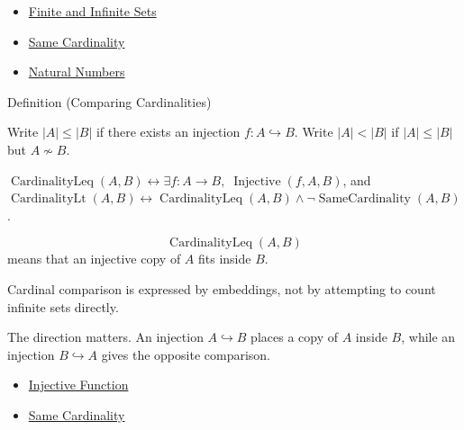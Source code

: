 \begin{dependencies}
\begin{itemize}
  \item \hyperref[def:finite-infinite]{Finite and Infinite Sets}
  \item \hyperref[def:same-cardinality]{Same Cardinality}
  \item \hyperref[def:natural-numbers]{Natural Numbers}
\end{itemize}
\end{dependencies}


\begin{definitionbox}{Definition (Comparing Cardinalities)}
\begin{definition}\label{def:cardinality-order}
Write $|A|\leq |B|$ if there exists an injection $f:A\hookrightarrow B$.
Write $|A|<|B|$ if $|A|\leq |B|$ but $A\not\sim B$.
\end{definition}
\end{definitionbox}

\begin{remark*}
$\operatorname{CardinalityLeq}(A,B)\leftrightarrow
\exists f:A\to B,\;\operatorname{Injective}(f,A,B)$, and
$\operatorname{CardinalityLt}(A,B)\leftrightarrow
\operatorname{CardinalityLeq}(A,B)\wedge
\neg\operatorname{SameCardinality}(A,B)$.
\end{remark*}

\begin{remark*}
\[
  \operatorname{CardinalityLeq}(A,B)
\] means that an injective copy of $A$ fits
inside $B$.
\end{remark*}

\begin{remark*}[Interpretation]
Cardinal comparison is expressed by embeddings, not by attempting to count
infinite sets directly.
\end{remark*}

\begin{remark*}[Exposition]
The direction matters. An injection $A\hookrightarrow B$ places a copy of
$A$ inside $B$, while an injection $B\hookrightarrow A$ gives the opposite
comparison.
\end{remark*}

\begin{dependencies}
\begin{itemize}
  \item \hyperref[def:injective]{Injective Function}
  \item \hyperref[def:same-cardinality]{Same Cardinality}
\end{itemize}
\end{dependencies}

